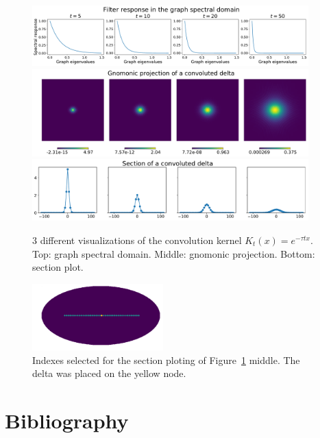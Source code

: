 \documentclass[final,twocolumn,3p,times,authoryear]{elsarticle}
\newcommand{\1}{\b{1}}              %
\newcommand{\0}{\b{0}}              %
\begin{document}
\begin{figure}[!ht]
\centering
\includegraphics[width=0.95\textwidth]{figures/gaussian_filters_spectral.pdf}
\includegraphics[width=0.95\textwidth]{figures/gaussian_filters_gnomonic.pdf}
\includegraphics[width=0.95\textwidth]{figures/gaussian_filters_section.pdf}
\caption{3 different visualizations of the convolution kernel $K_t(x)=e^{-\tau t x}$.
Top: graph spectral domain.
Middle: gnomonic projection.
Bottom: section plot.}
\label{fig:gaussian_filters_visualization}
\end{figure}

\begin{figure}[!ht]
\centering
\includegraphics[width=0.45\textwidth]{figures/index_plotting_order20_nside16.pdf}
\caption{Indexes selected for the section ploting of Figure~\ref{fig:gaussian_filters_visualization} middle. The delta was placed on the yellow node.}
\label{fig:index_section}
\end{figure}



\section*{Bibliography}


\end{document}
